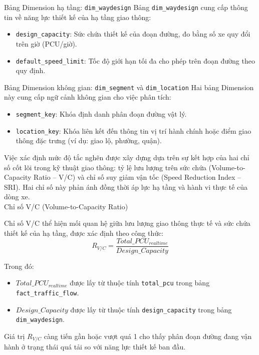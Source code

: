 Bảng Dimension hạ tầng: \texttt{dim\_waydesign}
Bảng \texttt{dim\_waydesign} cung cấp thông tin về năng lực thiết kế của hạ tầng giao thông:
\begin{itemize}
    \item \texttt{design\_capacity}: Sức chứa thiết kế của đoạn đường, đo bằng số xe quy đổi trên giờ (PCU/giờ).
    \item \texttt{default\_speed\_limit}: Tốc độ giới hạn tối đa cho phép trên đoạn đường theo quy định.
\end{itemize}

Bảng Dimension không gian: \texttt{dim\_segment} và \texttt{dim\_location}
Hai bảng Dimension này cung cấp ngữ cảnh không gian cho việc phân tích:
\begin{itemize}
    \item \texttt{segment\_key}: Khóa định danh phân đoạn đường vật lý.
    \item \texttt{location\_key}: Khóa liên kết đến thông tin vị trí hành chính hoặc điểm giao thông đặc trưng (ví dụ: giao lộ, phường, quận).
\end{itemize}


Việc xác định mức độ tắc nghẽn được xây dựng dựa trên sự kết hợp của hai chỉ số cốt lõi trong kỹ thuật giao thông: tỷ lệ lưu lượng trên sức chứa (Volume-to-Capacity Ratio -- V/C) và chỉ số suy giảm vận tốc (Speed Reduction Index -- SRI). Hai chỉ số này phản ánh đồng thời áp lực hạ tầng và hành vi thực tế của dòng xe.\\

Chỉ số V/C (Volume-to-Capacity Ratio)

Chỉ số V/C thể hiện mối quan hệ giữa lưu lượng giao thông thực tế và sức chứa thiết kế của hạ tầng, được xác định theo công thức:
\[
R_{V/C} = \frac{Total\_PCU_{realtime}}{Design\_Capacity}
\]

Trong đó:
\begin{itemize}
    \item $Total\_PCU_{realtime}$ được lấy từ thuộc tính \texttt{total\_pcu} trong bảng \texttt{fact\_traffic\_flow}.
    \item $Design\_Capacity$ được lấy từ thuộc tính \texttt{design\_capacity} trong bảng \texttt{dim\_waydesign}.
\end{itemize}

Giá trị $R_{V/C}$ càng tiến gần hoặc vượt quá 1 cho thấy phân đoạn đường đang vận hành ở trạng thái quá tải so với năng lực thiết kế ban đầu.\\

